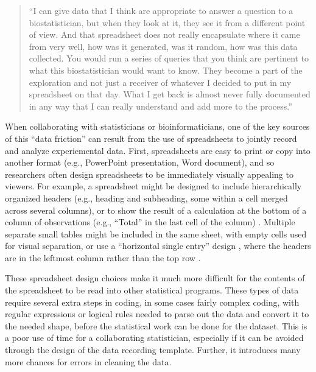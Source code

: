 \documentclass[]{tufte-book}
\begin{document}
\begin{quote}
``I can give data that I think are appropriate to answer a question to a
biostatistician, but when they look at it, they see it from a different point of
view. And that spreadsheet does not really encapsulate where it came from very
well, how was it generated, was it random, how was this data collected. You
would run a series of queries that you think are pertinent to what this
biostatistician would want to know. They become a part of the exploration and
not just a receiver of whatever I decided to put in my spreadsheet on that day.
What I get back is almost never fully documented in any way that I can really
understand and add more to the process.'' \citep{myneni2010organization}
\end{quote}

When collaborating with statisticians or bioinformaticians, one of the key
sources of this ``data friction'' can result from the use of spreadsheets to
jointly record and analyze experiemental data. First, spreadsheets are easy to
print or copy into another format (e.g., PowerPoint presentation, Word
document), and so researchers often design spreadsheets to be immediately
visually appealing to viewers. For example, a spreadsheet might be designed to
include hierarchically organized headers (e.g., heading and subheading, some
within a cell merged across several columns), or to show the result of a
calculation at the bottom of a column of observations (e.g., ``Total'' in the last
cell of the column) \citep{teixeira2016emergence}. Multiple separate small tables
might be included in the same sheet, with empty cells used for visual
separation, or use a ``horizontal single entry'' design , where the headers are in
the leftmost column rather than the top row \citep{teixeira2016emergence}.

These spreadsheet design choices make it much more difficult for the contents of
the spreadsheet to be read into other statistical programs. These types of data
require several extra steps in coding, in some cases fairly complex coding, with
regular expressions or logical rules needed to parse out the data and convert it
to the needed shape, before the statistical work can be done for the dataset.
This is a poor use of time for a collaborating statistician, especially if it
can be avoided through the design of the data recording template. Further, it
introduces many more chances for errors in cleaning the data.
\end{document}
